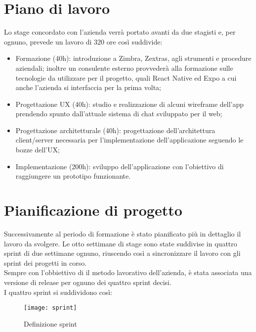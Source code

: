 \section{Piano di lavoro}
Lo stage concordato con l'azienda verrà portato avanti da due stagisti e, per ognuno, prevede un lavoro di 320 ore così suddivide:
\begin{itemize}
	\item Formazione (40h): introduzione a Zimbra, Zextras, agli strumenti e procedure aziendali; inoltre un consulente esterno provvederà alla formazione sulle tecnologie da utilizzare per il progetto, quali React Native ed Expo a cui anche l'azienda si interfaccia per la prima volta;
	\item  Progettazione UX (40h): studio e realizzazione di alcuni wireframe dell'app prendendo spunto dall’attuale sistema di chat sviluppato per il web;
	\item Progettazione architetturale (40h): progettazione dell’architettura client/server necessaria per l’implementazione dell'applicazione seguendo le bozze dell’UX;
	\item Implementazione (200h): sviluppo dell’applicazione con l’obiettivo di raggiungere un
	prototipo funzionante.
	
\end{itemize}

\section{Pianificazione di progetto}
Successivamente al periodo di formazione è stato pianificato più in dettaglio il lavoro da svolgere. Le otto settimane di stage sono state suddivise in quattro sprint di due settimane ognuno, riuscendo così a sincronizzare il lavoro con gli sprint dei progetti in corso. \\ Sempre con l'obbiettivo di  il metodo lavorativo dell'azienda, è stata associata una versione di release per ognuno dei quattro sprint decisi.  \\
I quattro sprint si suddividono così:
\begin{figure}[H] 
	\centering
	\texttt{[image: sprint]}
	\caption{Definizione sprint}
	\label{fig:sprint}
\end{figure}


